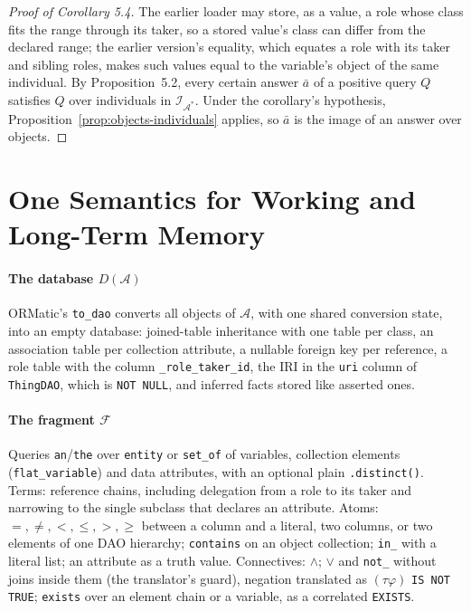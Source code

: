 \begin{proof}[Proof of Corollary 5.4]
The earlier loader may store, as a value, a role whose class fits the range through its taker, so
a stored value's class can differ from the declared range; the earlier version's equality, which
equates a role with its taker and sibling roles, makes such values equal to the variable's object
of the same individual.
By Proposition~5.2, every certain answer $\bar a$ of a positive query $Q$ satisfies $Q$ over
individuals in $\mathcal{I}_{\mathcal{A}^*}$. Under the corollary's hypothesis,
Proposition~\ref{prop:objects-individuals} applies, so $\bar a$ is the image of an answer over
objects.
\end{proof}

\section{One Semantics for Working and Long-Term Memory}
\label{sec:ormatic-theorem}

\paragraph{The database $D(\mathcal{A})$} ORMatic's \texttt{to\_dao} converts all objects of
$\mathcal{A}$, with one shared conversion state, into an empty database: joined-table
inheritance with one table per class, an association table per collection attribute, a nullable
foreign key per reference, a role table with the column \texttt{\_role\_taker\_id}, the IRI in
the \texttt{uri} column of \texttt{ThingDAO}, which is \texttt{NOT NULL}, and inferred facts stored
like asserted ones.

\paragraph{The fragment $\mathcal{F}$} Queries \texttt{an}/\texttt{the} over \texttt{entity} or
\texttt{set\_of} of variables, collection elements (\texttt{flat\_variable}) and data attributes,
with an optional plain \texttt{.distinct()}. Terms: reference chains, including delegation from a
role to its taker and narrowing to the single subclass that declares an attribute. Atoms:
$=,\neq,<,\le,>,\ge$ between a column and a literal, two columns, or two elements of one DAO
hierarchy; \texttt{contains} on an object collection; \texttt{in\_} with a literal list; an
attribute as a truth value. Connectives: $\wedge$; $\vee$ and \texttt{not\_} without joins inside
them (the translator's guard), negation translated as $(\tau\varphi)$ \texttt{IS NOT TRUE};
\texttt{exists} over an element chain or a variable, as a correlated \texttt{EXISTS}.


